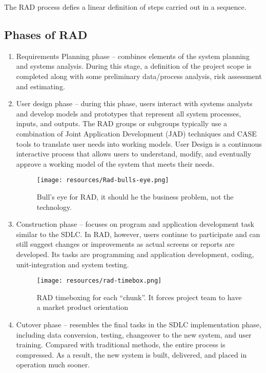 The RAD process defies a linear definition of steps carried out in a sequence. \cite{gottesdiener}

\subsection{Phases of RAD}

\begin{enumerate}
\item Requirements Planning phase -- combines elements of the system planning and systems analysis. During this stage, a definition of the project scope is completed along with some preliminary data/process analysis, risk assessment and estimating.

\item User design phase -- during this phase, users interact with systems analysts and develop models and prototypes that represent all system processes, inputs, and outputs. The RAD groups or subgroups typically use a combination of Joint Application Development (JAD) techniques and CASE tools to translate user needs into working models. User Design is a continuous interactive process that allows users to understand, modify, and eventually approve a working model of the system that meets their needs.

\begin{figure}
	\centering
	\texttt{[image: resources/Rad-bulls-eye.png]}
	\caption[Bull's eye for RAD]{Bull's eye for RAD, it should he the business problem, not the technology.}
\end{figure}

\item Construction phase -- focuses on program and application development task similar to the SDLC. In RAD, however, users continue to participate and can still suggest changes or improvements as actual screens or reports are developed. Its tasks are programming and application development, coding, unit-integration and system testing.

\begin{figure}
	\centering
	\texttt{[image: resources/rad-timebox.png]}
	\caption[RAD timeboxing]{RAD timeboxing for each ``chunk''. It forces project team to have a market product orientation}
\end{figure}


\item Cutover phase -- resembles the final tasks in the SDLC implementation phase, including data conversion, testing, changeover to the new system, and user training. Compared with traditional methods, the entire process is compressed. As a result, the new system is built, delivered, and placed in operation much sooner.
\end{enumerate}

